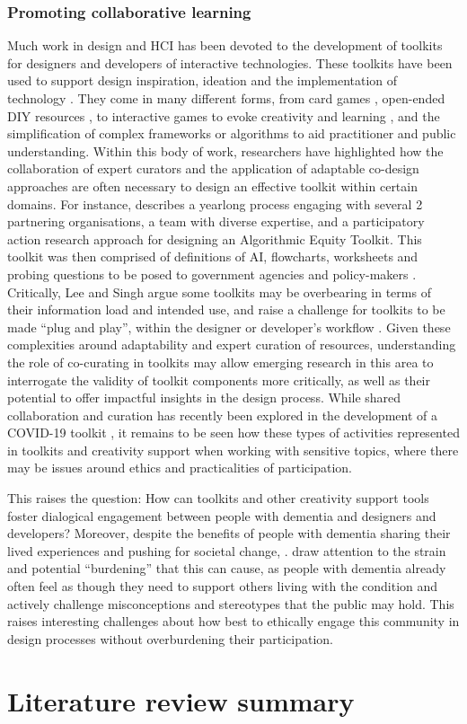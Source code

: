 \subsubsection{Promoting collaborative learning}
\label{BL:chapter7Overview}
Much work in design and HCI has been devoted to the development of toolkits for designers and developers of interactive technologies. These toolkits have been used to support design inspiration, ideation and the implementation of technology \citep{broderick2020theory,jarusriboonchai2018thinking,ledo2018evaluation}. They come in many different forms, from card games \citep{peters2020toolkits,logler2018metaphor,alshehri2020scenario}, open-ended DIY resources  \citep{meissner2018schnittmuster}, to interactive games to evoke creativity and learning \citep{ellis2021tapeblocks}, and the simplification of complex frameworks or algorithms to aid practitioner and public understanding\citep{srinivasan2012cultural}. Within this body of work, researchers have highlighted how the collaboration of expert curators and the application of adaptable co-design approaches are often necessary to design an effective toolkit within certain domains. For instance, \cite{krafft2021action} describes a yearlong process engaging with several 2 partnering organisations, a team with diverse expertise, and a participatory action research approach for designing an Algorithmic Equity Toolkit. This toolkit was then comprised of definitions of AI, flowcharts, worksheets and probing questions to be posed to government agencies and policy-makers \citep{katell2020toward}. Critically, Lee and Singh argue some toolkits may be overbearing in terms of their information load and intended use, and raise a challenge for toolkits to be made “plug and play”, within the designer or developer’s workflow \citep{lee2021landscape}. Given these complexities around adaptability and expert curation of resources, understanding the role of co-curating in toolkits may allow emerging research in this area to interrogate the validity of toolkit components more critically, as well as their potential to offer impactful insights in the design process. While shared collaboration and curation has recently been explored in the development of a COVID-19 toolkit \citep{braybrooke2020together}, it remains to be seen how these types of activities represented in toolkits and creativity support when working with sensitive topics, where there may be issues around ethics and practicalities of participation.

This raises the question: How can toolkits and other creativity support tools foster dialogical engagement between people with dementia and designers and developers? Moreover, despite the benefits of people with dementia sharing their lived experiences and pushing for societal change, \cite{johnson_older_2019}. draw attention to the strain and potential “burdening” that this can cause, as people with dementia already often feel as though they need to support others living with the condition and actively challenge misconceptions and stereotypes that the public may hold. This raises interesting challenges about how best to ethically engage this community in design processes without overburdening their participation.

\section{Literature review summary}
\label{BL:summary}

